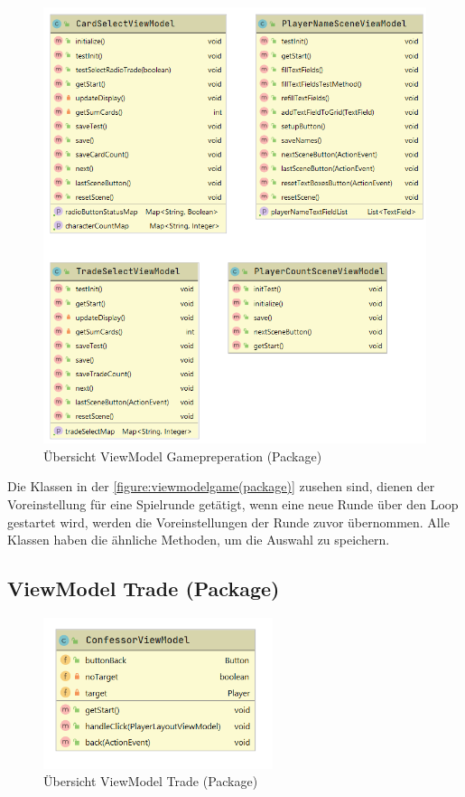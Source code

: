 \begin{figure}[H]
	\centering
	\includegraphics[width=\textwidth]{architektur/View_Game_Uebersicht.png}
	\caption{Übersicht ViewModel Gamepreperation (Package)}
	\label{figure:viewmodelgame(package)}
\end{figure}

Die Klassen in der \autoref{figure:viewmodelgame(package)} zusehen sind, dienen der Voreinstellung für eine Spielrunde getätigt, wenn eine neue Runde über den Loop gestartet wird, werden die Voreinstellungen der Runde zuvor übernommen. Alle Klassen haben die ähnliche Methoden, um die Auswahl zu speichern.
\subsection{ViewModel Trade (Package)}

\begin{figure}[H]
	\centering
	\includegraphics[width=0.6\textwidth]{architektur/View_Trade_Uebersicht.png}
	\caption{Übersicht ViewModel Trade (Package)}
	\label{figure:viewmodeltrade(package)}
\end{figure}

